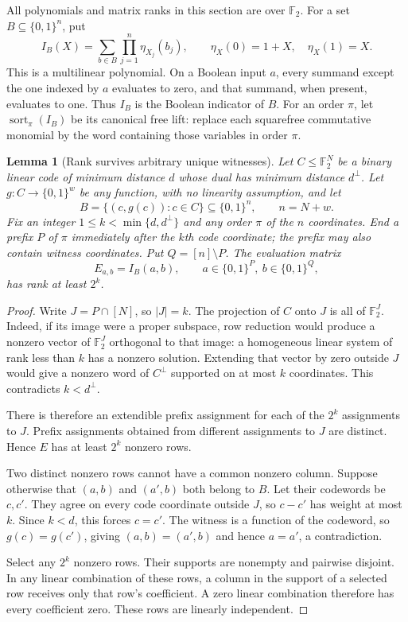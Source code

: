 \documentclass[11pt]{article}
\newtheorem{lemma}[theorem]{Lemma}
\theoremstyle{definition}
\theoremstyle{remark}
\begin{document}
All polynomials and matrix ranks in this section are over $\mathbb
F_2$. For a set $B\subseteq\{0,1\}^n$, put
\[
 I_B(X)=\sum_{b\in B}\prod_{j=1}^n\eta_{X_j}(b_j),
 \qquad \eta_X(0)=1+X,\quad \eta_X(1)=X.
\]
This is a multilinear polynomial. On a Boolean input $a$, every
summand except the one indexed by $a$ evaluates to zero, and that
summand, when present, evaluates to one. Thus $I_B$ is the Boolean
indicator of $B$. For an order $\pi$, let
$\operatorname{sort}_{\pi}(I_B)$ be its canonical free lift: replace
each squarefree commutative monomial by the word containing those
variables in order $\pi$.

\begin{lemma}[Rank survives arbitrary unique witnesses]
\label{lem:code-rank-unique-witnesses}
Let $C\le\mathbb F_2^N$ be a binary linear code of minimum distance
$d$ whose dual has minimum distance $d^\perp$. Let
$g:C\longrightarrow\{0,1\}^w$ be any function, with no linearity
assumption, and let
\[
 B=\{(c,g(c)):c\in C\}\subseteq\{0,1\}^{n},\qquad n=N+w.
\]
Fix an integer $1\le k<\min\{d,d^\perp\}$ and any order $\pi$ of
the $n$ coordinates. End a prefix $P$ of $\pi$ immediately after
the $k$th code coordinate; the prefix may also contain witness
coordinates. Put $Q=[n]\setminus P$. The evaluation matrix
\[
 E_{a,b}=I_B(a,b),\qquad
 a\in\{0,1\}^{P},\ b\in\{0,1\}^{Q},
\]
has rank at least $2^k$.
\end{lemma}
\begin{proof}
Write $J=P\cap[N]$, so $|J|=k$. The projection of $C$ onto $J$
is all of $\mathbb F_2^J$. Indeed, if its image were a proper
subspace, row reduction would produce a nonzero vector of
$\mathbb F_2^J$ orthogonal to that image: a homogeneous linear
system of rank less than $k$ has a nonzero solution. Extending
that vector by zero outside $J$ would give a nonzero word of
$C^\perp$ supported on at most $k$ coordinates. This contradicts
$k<d^\perp$.

There is therefore an extendible prefix assignment for each of the
$2^k$ assignments to $J$. Prefix assignments obtained from different
assignments to $J$ are distinct. Hence $E$ has at least $2^k$
nonzero rows.

Two distinct nonzero rows cannot have a common nonzero column.
Suppose otherwise that $(a,b)$ and $(a',b)$ both belong to $B$.
Let their codewords be $c,c'$. They agree on every code coordinate
outside $J$, so $c-c'$ has weight at most $k$. Since $k<d$, this
forces $c=c'$. The witness is a function of the codeword, so
$g(c)=g(c')$, giving $(a,b)=(a',b)$ and hence $a=a'$, a
contradiction.

Select any $2^k$ nonzero rows. Their supports are nonempty and
pairwise disjoint. In any linear combination of these rows, a
column in the support of a selected row receives only that row's
coefficient. A zero linear combination therefore has every
coefficient zero. These rows are linearly independent.
\end{proof}
\end{document}
